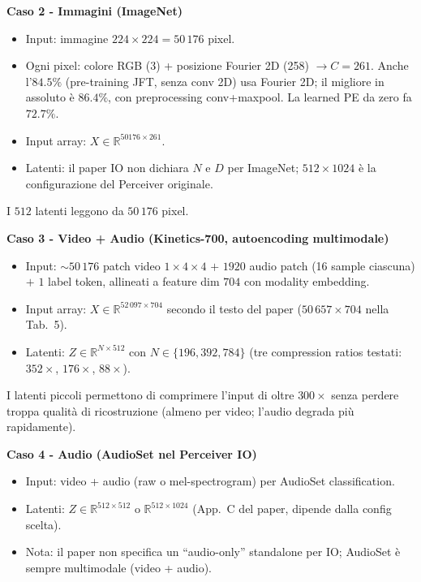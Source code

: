 \documentclass[
  11pt,
]{article}
\begin{document}
\textbf{Caso 2 - Immagini (ImageNet)}

\begin{itemize}
\item Input: immagine $224 \times 224 = 50\,176$ pixel.
\item Ogni pixel: colore RGB (3) + posizione Fourier 2D (258) $\to C = 261$. Anche l'$84.5\%$ (pre-training JFT, senza conv 2D) usa Fourier 2D; il migliore in assoluto è $86.4\%$, con preprocessing conv+maxpool. La learned PE da zero fa $72.7\%$.
\item Input array: $X \in \mathbb{R}^{50176 \times 261}$.
\item Latenti: il paper IO non dichiara $N$ e $D$ per ImageNet; $512 \times 1024$ è la configurazione del Perceiver originale.
\end{itemize}

I $512$ latenti leggono da $50\,176$ pixel.

\textbf{Caso 3 - Video + Audio (Kinetics-700, autoencoding multimodale)}

\begin{itemize}
\item Input: $\sim 50\,176$ patch video $1 \times 4 \times 4$ $+$ $1920$ audio patch (16 sample ciascuna) $+$ $1$ label token, allineati a feature dim $704$ con modality embedding.
\item Input array: $X \in \mathbb{R}^{52\,097 \times 704}$ secondo il testo del paper ($50\,657 \times 704$ nella Tab.~5).
\item Latenti: $Z \in \mathbb{R}^{N \times 512}$ con $N \in \{196, 392, 784\}$ (tre compression ratios testati: $352\times$, $176\times$, $88\times$).
\end{itemize}

I latenti piccoli permettono di comprimere l'input di oltre $300\times$ senza perdere troppa qualità di ricostruzione (almeno per video; l'audio degrada più rapidamente).

\textbf{Caso 4 - Audio (AudioSet nel Perceiver IO)}

\begin{itemize}
\item Input: video + audio (raw o mel-spectrogram) per AudioSet classification.
\item Latenti: $Z \in \mathbb{R}^{512 \times 512}$ o $\mathbb{R}^{512 \times 1024}$ (App.\ C del paper, dipende dalla config scelta).
\item Nota: il paper non specifica un ``audio-only'' standalone per IO; AudioSet è sempre multimodale (video + audio).
\end{itemize}
\end{document}
